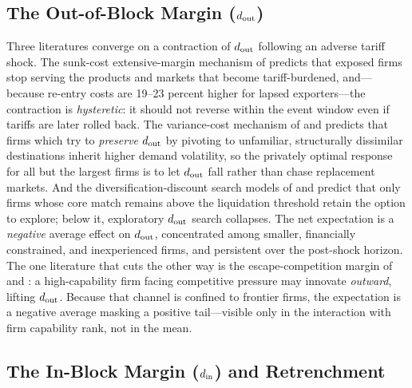 \subsection{The Out-of-Block Margin ($d_{\rm out}$)}
\label{subsec:exp_dout}

Three literatures converge on a contraction of $d_{\rm out}$ following an adverse
tariff shock. The sunk-cost extensive-margin mechanism of \citet{crozet2021} predicts
that exposed firms stop serving the products and markets that become tariff-burdened,
and---because re-entry costs are 19--23 percent higher for lapsed exporters---the
contraction is \emph{hysteretic}: it should not reverse within the event window even
if tariffs are later rolled back. The variance-cost mechanism of \citet{crozet2025}
and \citet{vannoorenberghe2016} predicts that firms which try to \emph{preserve}
$d_{\rm out}$ by pivoting to unfamiliar, structurally dissimilar destinations inherit
higher demand volatility, so the privately optimal response for all but the largest
firms is to let $d_{\rm out}$ fall rather than chase replacement markets. And the
diversification-discount search models of \citet{matsusaka2001} and \citet{bernardo2002}
predict that only firms whose core match remains above the liquidation threshold retain
the option to explore; below it, exploratory $d_{\rm out}$ search collapses. The net
expectation is a \emph{negative} average effect on $d_{\rm out}$, concentrated among
smaller, financially constrained, and inexperienced firms, and persistent over the
post-shock horizon. The one literature that cuts the other way is the escape-competition
margin of \citet{aghion2005} and \citet{akcigit2022}: a high-capability firm facing
competitive pressure may innovate \emph{outward}, lifting $d_{\rm out}$. Because that
channel is confined to frontier firms, the expectation is a negative average masking a
positive tail---visible only in the interaction with firm capability rank, not in the
mean.

\subsection{The In-Block Margin ($d_{\rm in}$) and Retrenchment}
\label{subsec:exp_din}


